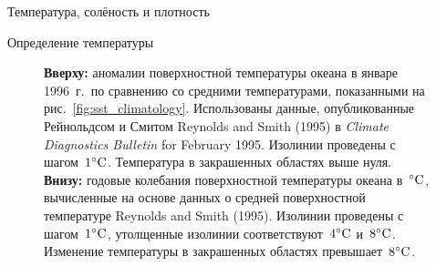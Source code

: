 \begin{chapter}{Температура, солёность и плотность}
\begin{section}{Определение температуры}
\begin{figure}[b!]
\caption{\textbf{Вверху:} аномалии поверхностной температуры океана в январе
1996~г.\ по сравнению со средними температурами, показанными на 
рис.~\ref{fig:sst_climatology}. Использованы данные, опубликованные 
Рейнольдсом и Смитом Reynolds and Smith (1995) 
в \textit{Climate Diagnostics Bulletin} for February 1995.
Изолинии проведены с шагом~${1}^\circ\mbox{C}$. Температура в закрашенных
областях выше нуля.
\textbf{Внизу:} годовые колебания поверхностной температуры океана 
в~${}^\circ\mbox{C}$, вычисленные на основе данных о средней поверхностной 
температуре Reynolds and Smith (1995). Изолинии проведены с 
шагом~${1}^\circ\mbox{C}$, утолщенные изолинии соответствуют~${4}^\circ\mbox{C}$
и~${8}^\circ\mbox{C}$. Изменение температуры в закрашенных областях 
превышает~${8}^\circ\mbox{C}$.}
\label{fig:SSTvariability}
\end{figure}
%

\end{section}
\end{chapter}
